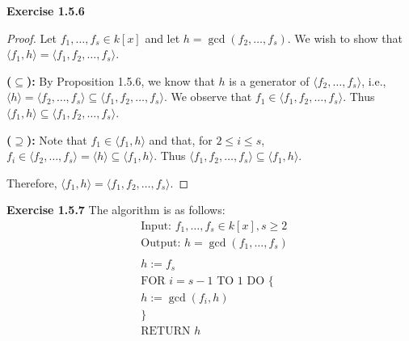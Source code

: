 \documentclass[12pt,oneside]{article}
\newenvironment{exercise}[1]{\vspace{.1in}\noindent\textbf{Exercise #1 \hspace{.05em}}}{}
\begin{document}
\begin{exercise}{1.5.6}
    \begin{proof}
        Let $f_1,\ldots,f_s \in k[x]$ and let $h=\gcd(f_2,\ldots,f_s)$. We 
        wish to show that $\langle f_1,h \rangle = \langle f_1,f_2,\ldots,f_s \rangle$.

        \bigskip
        \textbf{($\subseteq$):} By Proposition 1.5.6, we know that $h$ is a generator of 
        $\langle f_2,\ldots,f_s \rangle$, i.e.,
        $\langle h \rangle = \langle f_2,\ldots,f_s \rangle \subseteq \langle f_1,f_2,\ldots,f_s \rangle$.
        We observe that $f_1 \in \langle f_1,f_2,\ldots,f_s \rangle$. Thus 
        $\langle f_1, h \rangle \subseteq \langle f_1,f_2,\ldots,f_s \rangle$.

        \bigskip
        \textbf{($\supseteq$):} Note that $f_1 \in \langle f_1,h \rangle$ and that,
        for $2 \leq i \leq s$, $f_i \in \langle f_2,\ldots,f_s \rangle = \langle h \rangle \subseteq \langle f_1, h \rangle$.
        Thus $\langle f_1,f_2,\ldots,f_s \rangle \subseteq \langle f_1,h \rangle$.

        Therefore, $\langle f_1,h \rangle = \langle f_1,f_2,\ldots,f_s \rangle$.
    \end{proof}
\end{exercise}


\begin{exercise}{1.5.7}
    The algorithm is as follows:
    \begin{align*}
        &\text{Input: }f_1,\ldots,f_s \in k[x], s\geq 2\\
        &\text{Output: }h = \gcd(f_1,\ldots,f_s)\\
        \\
        &h:=f_s\\
        &\text{FOR }i=s-1 \text{ TO } 1 \text{ DO \{}\\
        &h:=\gcd(f_i,h)\\
        &\}\\
        &\text{RETURN }h
    \end{align*}
\end{exercise}

\end{document}
